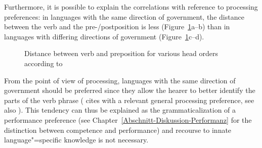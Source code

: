 Furthermore, it is possible to explain the correlations with reference to processing preferences: in languages with the same direction of government, the distance between the verb
and the pre-/postposition is less (Figure~\ref{fig-head-position}a--b) than in languages with
differing directions of government (Figure~\ref{fig-head-position}c--d).
\begin{figure}
\hfill
\hfill
{}\hfill\mbox{}

\hfill
{}
\hfill
{}
\hfill\mbox{}
\caption{Distance between verb and preposition for various head orders according to \citet[]{Newmeyer2004b}}\label{fig-head-position}
\end{figure}%
From the point of view of processing, languages with the same direction of government should be preferred since they allow the hearer to better identify the parts
of the verb phrase (\citet[--221]{Newmeyer2004b} cites 
with a relevant general processing preference, see also ). This tendency can thus be explained as the
grammaticalization of a performance preference (see Chapter~\ref{Abschnitt-Diskussion-Performanz}
for the distinction between competence and performance) and recourse to innate language"=specific
knowledge is not necessary.%

